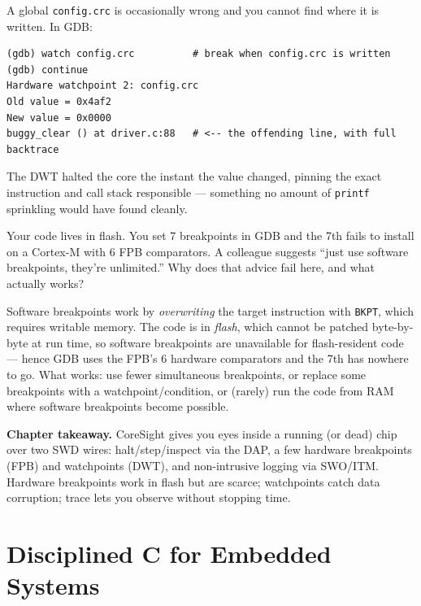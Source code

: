 \documentclass[11pt,a4paper,oneside]{book}
\newcommand{\code}[1]{\texttt{#1}}
\begin{document}
\begin{wexample}
A global \code{config.crc} is occasionally wrong and you cannot find where it is
written. In GDB:
\begin{lstlisting}[style=shell]
(gdb) watch config.crc          # break when config.crc is written
(gdb) continue
Hardware watchpoint 2: config.crc
Old value = 0x4af2
New value = 0x0000
buggy_clear () at driver.c:88   # <-- the offending line, with full backtrace
\end{lstlisting}
The DWT halted the core the instant the value changed, pinning the exact
instruction and call stack responsible --- something no amount of
\code{printf} sprinkling would have found cleanly.
\end{wexample}

\begin{exercise}
Your code lives in flash. You set 7 breakpoints in GDB and the 7th fails to
install on a Cortex-M with 6 FPB comparators. A colleague suggests ``just use
software breakpoints, they're unlimited.'' Why does that advice fail here, and
what actually works?
\end{exercise}
\begin{solution}
Software breakpoints work by \emph{overwriting} the target instruction with
\code{BKPT}, which requires writable memory. The code is in \emph{flash}, which
cannot be patched byte-by-byte at run time, so software breakpoints are
unavailable for flash-resident code --- hence GDB uses the FPB's 6 hardware
comparators and the 7th has nowhere to go. What works: use fewer simultaneous
breakpoints, or replace some breakpoints with a watchpoint/condition, or (rarely)
run the code from RAM where software breakpoints become possible.
\end{solution}

\begin{keyidea}
\textbf{Chapter takeaway.} CoreSight gives you eyes inside a running (or dead)
chip over two SWD wires: halt/step/inspect via the DAP, a few hardware
breakpoints (FPB) and watchpoints (DWT), and non-intrusive logging via SWO/ITM.
Hardware breakpoints work in flash but are scarce; watchpoints catch data
corruption; trace lets you observe without stopping time.
\end{keyidea}

\part{Disciplined C for Embedded Systems}
\end{document}
